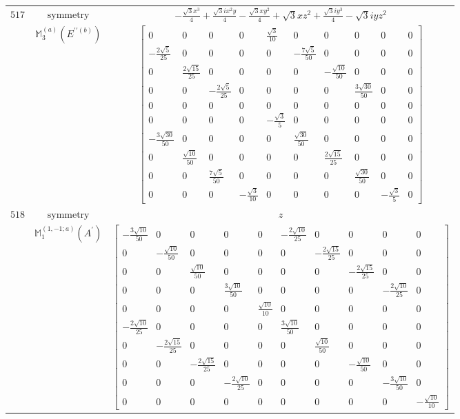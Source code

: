 \documentclass[fleqn,8pt,landscape]{jsarticle}
\begin{document}
\begin{longtable}{ccc}
$ 517 $ & $ \text{symmetry} $ & $ - \frac{\sqrt{3} x^{3}}{4} + \frac{\sqrt{3} i x^{2} y}{4} - \frac{\sqrt{3} x y^{2}}{4} + \sqrt{3} x z^{2} + \frac{\sqrt{3} i y^{3}}{4} - \sqrt{3} i y z^{2} $ \\
$  $ & $ \mathbb{M}_{3}^{(a)}(E^{\prime\prime(b)}) $ & $ \begin{bmatrix} 0 & 0 & 0 & 0 & \frac{\sqrt{3}}{10} & 0 & 0 & 0 & 0 & 0 \\ - \frac{2 \sqrt{5}}{25} & 0 & 0 & 0 & 0 & - \frac{7 \sqrt{5}}{50} & 0 & 0 & 0 & 0 \\ 0 & \frac{2 \sqrt{15}}{25} & 0 & 0 & 0 & 0 & - \frac{\sqrt{10}}{50} & 0 & 0 & 0 \\ 0 & 0 & - \frac{2 \sqrt{5}}{25} & 0 & 0 & 0 & 0 & \frac{3 \sqrt{30}}{50} & 0 & 0 \\ 0 & 0 & 0 & 0 & 0 & 0 & 0 & 0 & 0 & 0 \\ 0 & 0 & 0 & 0 & - \frac{\sqrt{3}}{5} & 0 & 0 & 0 & 0 & 0 \\ - \frac{3 \sqrt{30}}{50} & 0 & 0 & 0 & 0 & \frac{\sqrt{30}}{50} & 0 & 0 & 0 & 0 \\ 0 & \frac{\sqrt{10}}{50} & 0 & 0 & 0 & 0 & \frac{2 \sqrt{15}}{25} & 0 & 0 & 0 \\ 0 & 0 & \frac{7 \sqrt{5}}{50} & 0 & 0 & 0 & 0 & \frac{\sqrt{30}}{50} & 0 & 0 \\ 0 & 0 & 0 & - \frac{\sqrt{3}}{10} & 0 & 0 & 0 & 0 & - \frac{\sqrt{3}}{5} & 0 \end{bmatrix} $ \\ \hline
$ 518 $ & $ \text{symmetry} $ & $ z $ \\
$  $ & $ \mathbb{M}_{1}^{(1,-1;a)}(A^{\prime}) $ & $ \begin{bmatrix} - \frac{3 \sqrt{10}}{50} & 0 & 0 & 0 & 0 & - \frac{2 \sqrt{10}}{25} & 0 & 0 & 0 & 0 \\ 0 & - \frac{\sqrt{10}}{50} & 0 & 0 & 0 & 0 & - \frac{2 \sqrt{15}}{25} & 0 & 0 & 0 \\ 0 & 0 & \frac{\sqrt{10}}{50} & 0 & 0 & 0 & 0 & - \frac{2 \sqrt{15}}{25} & 0 & 0 \\ 0 & 0 & 0 & \frac{3 \sqrt{10}}{50} & 0 & 0 & 0 & 0 & - \frac{2 \sqrt{10}}{25} & 0 \\ 0 & 0 & 0 & 0 & \frac{\sqrt{10}}{10} & 0 & 0 & 0 & 0 & 0 \\ - \frac{2 \sqrt{10}}{25} & 0 & 0 & 0 & 0 & \frac{3 \sqrt{10}}{50} & 0 & 0 & 0 & 0 \\ 0 & - \frac{2 \sqrt{15}}{25} & 0 & 0 & 0 & 0 & \frac{\sqrt{10}}{50} & 0 & 0 & 0 \\ 0 & 0 & - \frac{2 \sqrt{15}}{25} & 0 & 0 & 0 & 0 & - \frac{\sqrt{10}}{50} & 0 & 0 \\ 0 & 0 & 0 & - \frac{2 \sqrt{10}}{25} & 0 & 0 & 0 & 0 & - \frac{3 \sqrt{10}}{50} & 0 \\ 0 & 0 & 0 & 0 & 0 & 0 & 0 & 0 & 0 & - \frac{\sqrt{10}}{10} \end{bmatrix} $ \\ \hline

\end{longtable}
\end{document}
